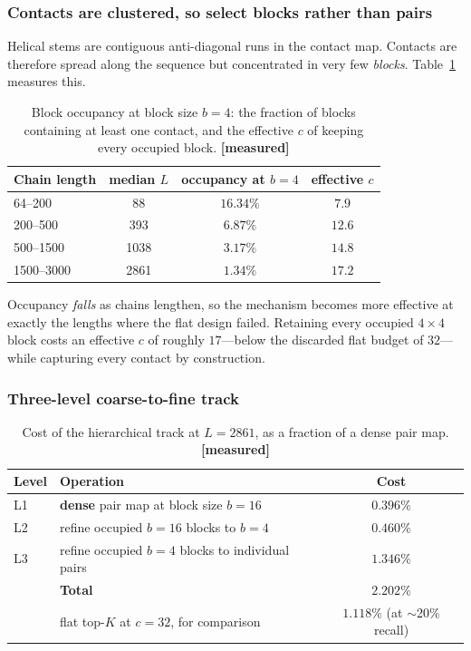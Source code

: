 \documentclass[11pt,a4paper]{article}
\newcommand{\meas}{\textcolor{measured}{\textbf{[measured]}}}
\begin{document}
\subsubsection{Contacts are clustered, so select blocks rather than pairs}

Helical stems are contiguous anti-diagonal runs in the contact map. Contacts are
therefore spread along the sequence but concentrated in very few
\emph{blocks}. Table~\ref{tab:blocks} measures this.

\begin{table}[h]
\centering
\caption{Block occupancy at block size $b=4$: the fraction of blocks containing
at least one contact, and the effective $c$ of keeping every occupied block. \meas}
\label{tab:blocks}
\begin{tabular}{lccc}
\toprule
\textbf{Chain length} & \textbf{median $L$} & \textbf{occupancy at $b=4$} & \textbf{effective $c$} \\
\midrule
64--200    & 88   & $16.34\%$ & $7.9$ \\
200--500   & 393  & $6.87\%$  & $12.6$ \\
500--1500  & 1038 & $3.17\%$  & $14.8$ \\
1500--3000 & 2861 & $\mathbf{1.34\%}$ & $\mathbf{17.2}$ \\
\bottomrule
\end{tabular}
\end{table}

Occupancy \emph{falls} as chains lengthen, so the mechanism becomes more
effective at exactly the lengths where the flat design failed. Retaining every
occupied $4\times4$ block costs an effective $c$ of roughly $17$---below the
discarded flat budget of $32$---while capturing every contact by construction.

\subsubsection{Three-level coarse-to-fine track}

\begin{table}[h]
\centering
\caption{Cost of the hierarchical track at $L = 2861$, as a fraction of a dense
pair map. \meas}
\begin{tabular}{llc}
\toprule
\textbf{Level} & \textbf{Operation} & \textbf{Cost} \\
\midrule
L1 & \textbf{dense} pair map at block size $b=16$ & $0.396\%$ \\
L2 & refine occupied $b=16$ blocks to $b=4$ & $0.460\%$ \\
L3 & refine occupied $b=4$ blocks to individual pairs & $1.346\%$ \\
\midrule
& \textbf{Total} & $\mathbf{2.202\%}$ \\
& flat top-$K$ at $c=32$, for comparison & $1.118\%$ (at $\sim$20\% recall) \\
\bottomrule
\end{tabular}
\end{table}
\end{document}

